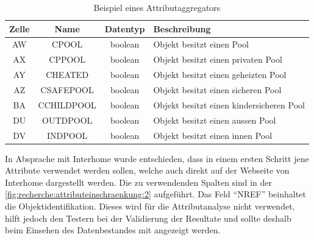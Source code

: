 \begin{table}[H] 
	\caption{Beispiel eines Attributaggregators}
	\centering
		\label{fig:recherche:attributeinschraenkung:1}
	\begin{tabular}{ | c | c | c | l | } 
		\hline 
		\rowcolor{tableheadcolor}
		\bfseries Zelle & \bfseries Name & \bfseries Datentyp & \bfseries Beschreibung \\ \hline 
		AW & CPOOL & boolean & Objekt besitzt einen Pool \\ \hline 
		AX & CPPOOL & boolean & Objekt besitzt einen privaten Pool \\ \hline 
		AY & CHEATED & boolean & Objekt besitzt einen geheizten Pool \\ \hline 
		AZ & CSAFEPOOL & boolean & Objekt besitzt einen sicheren Pool \\ \hline 
		BA & CCHILDPOOL & boolean & Objekt besitzt einen kindersicheren Pool \\ \hline 
		DU & OUTDPOOL & boolean & Objekt besitzt einen aussen Pool \\ \hline 
		DV & INDPOOL & boolean & Objekt besitzt einen innen Pool \\ \hline 
	\end{tabular}
\end{table}

In Absprache mit Interhome wurde entschieden, dass in einem ersten Schritt jene Attribute verwendet werden sollen, welche auch direkt auf der Webseite von Interhome dargestellt werden. Die zu verwendenden Spalten sind in der \cref{fig:recherche:attributeinschraenkung:2} aufgeführt. Das Feld "`NREF"' beinhaltet die Objektidentifikation. Dieses wird für die Attributanalyse nicht verwendet, hilft jedoch den Testern bei der Validierung der Resultate und sollte deshalb beim Einsehen des Datenbestandes mit angezeigt werden.

